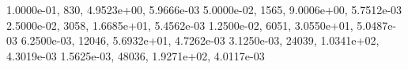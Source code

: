 1.0000e-01,   830, 4.9523e+00, 5.9666e-03
5.0000e-02,  1565, 9.0006e+00, 5.7512e-03
2.5000e-02,  3058, 1.6685e+01, 5.4562e-03
1.2500e-02,  6051, 3.0550e+01, 5.0487e-03
6.2500e-03, 12046, 5.6932e+01, 4.7262e-03
3.1250e-03, 24039, 1.0341e+02, 4.3019e-03
1.5625e-03, 48036, 1.9271e+02, 4.0117e-03
